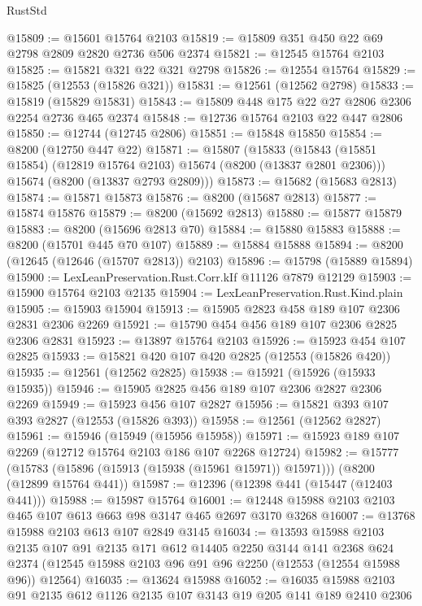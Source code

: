 \begin{lexlean}{RustStd}
\begin{coremodule}
@15809 := @15601 @15764 @2103
@15819 := @15809 @351 @450 @22 @69 @2798 @2809 @2820 @2736 @506 @2374
@15821 := @12545 @15764 @2103
@15825 := @15821 @321 @22 @321 @2798
@15826 := @12554 @15764
@15829 := @15825 (@12553 (@15826 @321))
@15831 := @12561 (@12562 @2798)
@15833 := @15819 (@15829 @15831)
@15843 := @15809 @448 @175 @22 @27 @2806 @2306 @2254 @2736 @465 @2374
@15848 := @12736 @15764 @2103 @22 @447 @2806
@15850 := @12744 (@12745 @2806)
@15851 := @15848 @15850
@15854 := @8200 (@12750 @447 @22)
@15871 := @15807
    (@15833
      (@15843 (@15851 @15854) (@12819 @15764 @2103) @15674 (@8200 (@13837 @2801 @2306)))
      @15674
      (@8200 (@13837 @2793 @2809)))
@15873 := @15682 (@15683 @2813)
@15874 := @15871 @15873
@15876 := @8200 (@15687 @2813)
@15877 := @15874 @15876
@15879 := @8200 (@15692 @2813)
@15880 := @15877 @15879
@15883 := @8200 (@15696 @2813 @70)
@15884 := @15880 @15883
@15888 := @8200 (@15701 @445 @70 @107)
@15889 := @15884 @15888
@15894 := @8200 (@12645 (@12646 (@15707 @2813)) @2103)
@15896 := @15798 (@15889 @15894)
@15900 := LexLeanPreservation.Rust.Corr.kIf @11126 @7879 @12129
@15903 := @15900 @15764 @2103 @2135
@15904 := LexLeanPreservation.Rust.Kind.plain
@15905 := @15903 @15904
@15913 := @15905 @2823 @458 @189 @107 @2306 @2831 @2306 @2269
@15921 := @15790 @454 @456 @189 @107 @2306 @2825 @2306 @2831
@15923 := @13897 @15764 @2103
@15926 := @15923 @454 @107 @2825
@15933 := @15821 @420 @107 @420 @2825 (@12553 (@15826 @420))
@15935 := @12561 (@12562 @2825)
@15938 := @15921 (@15926 (@15933 @15935))
@15946 := @15905 @2825 @456 @189 @107 @2306 @2827 @2306 @2269
@15949 := @15923 @456 @107 @2827
@15956 := @15821 @393 @107 @393 @2827 (@12553 (@15826 @393))
@15958 := @12561 (@12562 @2827)
@15961 := @15946 (@15949 (@15956 @15958))
@15971 := @15923 @189 @107 @2269 (@12712 @15764 @2103 @186 @107 @2268 @12724)
@15982 := @15777
    (@15783 (@15896 (@15913 (@15938 (@15961 @15971)) @15971)))
    (@8200 (@12899 @15764 @441))
@15987 := @12396 (@12398 @441 (@15447 (@12403 @441)))
@15988 := @15987 @15764
@16001 := @12448 @15988 @2103 @2103 @465 @107 @613 @663 @98 @3147 @465 @2697 @3170 @3268
@16007 := @13768 @15988 @2103 @613 @107 @2849 @3145
@16034 := @13593
    @15988
    @2103
    @2135
    @107
    @91
    @2135
    @171
    @612
    @14405
    @2250
    @3144
    @141
    @2368
    @624
    @2374
    (@12545 @15988 @2103 @96 @91 @96 @2250 (@12553 (@12554 @15988 @96)) @12564)
@16035 := @13624 @15988
@16052 := @16035
    @15988
    @2103
    @91
    @2135
    @612
    @1126
    @2135
    @107
    @3143
    @19
    @205
    @141
    @189
    @2410
    @2306

\end{coremodule}
\end{lexlean}
